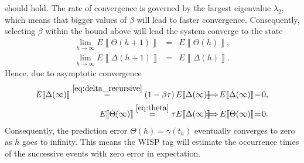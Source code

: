 \documentclass[10pt,journal,compsoc]{IEEEtran}
\newcommand{\expected}[1]{E\!\left\llbracket #1 \right\rrbracket}
\begin{document}
should hold. The 
rate of convergence is governed by 
the largest eigenvalue $\lambda_2$, which means that bigger values of $\beta$ 
will lead to faster convergence. 
Consequently, selecting $\beta$ within the bound above will lead the system  
converge to the state  
\begin{eqnarray}
\underset{h\rightarrow\infty}{\lim}\expected{\Theta(h+1)} &=&
\expected{\Theta(h)}, \label{eq:asymp_theta} \\
\underset{h\rightarrow\infty}{\lim}\expected{\Delta(h+1)}&=&
\expected{\Delta(h)} \label{eq:asymp_delta}.
\end{eqnarray}
Hence, due to asymptotic convergence
\begin{eqnarray}
\expected{\Delta(\infty)} \overset{\eqref{eq:delta_recursive}}{=} 
\left(1-\beta 
\tau\right)\expected{\Delta(\infty)} &\!\!\!\!\!\!\!\implies\!\!\!\!\!\!\!& \expected{\Delta(\infty)}\!=\!0, 
\label{eq:delta_convergence}\\
\expected{\Theta(\infty)}  \overset{\eqref{eq:theta}}{=} 
\tau\expected{\Delta(\infty)}&\!\!\!\!\!\!\!\implies\!\!\!\!\!\!\!&\expected{\Theta(\infty)}\!=\!0. 
\label{eq:expected_error}
\end{eqnarray}
Consequently, the prediction error $\Theta(h)=\gamma(t_h)$ 
eventually converges to zero as $h$ goes to infinity. This means the WISP tag 
will estimate the occurrence times of the successive
events with zero error in expectation. 
\end{document}
